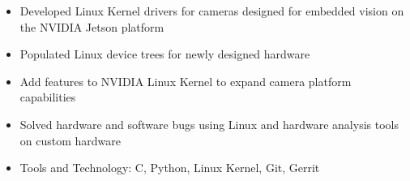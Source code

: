 \begin{itemize}
    \setlength\itemsep{0pt}
    \setlength{\parskip}{0pt}
    \item Developed Linux Kernel drivers for cameras designed for embedded vision on the NVIDIA Jetson platform
    \item Populated Linux device trees for newly designed hardware
    \item Add features to NVIDIA Linux Kernel to expand camera platform capabilities
    \item Solved hardware and software bugs using Linux and hardware analysis tools on custom hardware
    \item Tools and Technology: C, Python, Linux Kernel, Git, Gerrit
\end{itemize}
